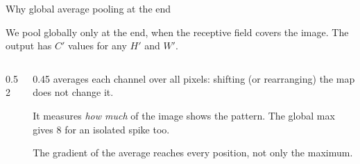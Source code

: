 \documentclass[11pt,aspectratio=169]{beamer}
\begin{document}
\begin{whiteframe}{Why global average pooling at the end}
    \setlength{\parskip}{5pt}

    We pool globally only at the end, when the receptive field covers the
    image. The output has $C'$ values for any $H'$ and $W'$.

    \begin{columns}[c,onlytextwidth]
        \begin{column}{0.52\textwidth}
            \centering
            
        \end{column}
        \begin{column}{0.45\textwidth}
            \small\setlength{\parskip}{7pt}%
             averages each channel over all
            pixels: shifting (or rearranging) the map does not change it.

            It measures \textit{how much} of the image shows the pattern. The
            global max gives $8$ for an isolated spike too.

            The gradient of the average reaches every position, not only the
            maximum.
        \end{column}
    \end{columns}


\end{whiteframe}
\end{document}
